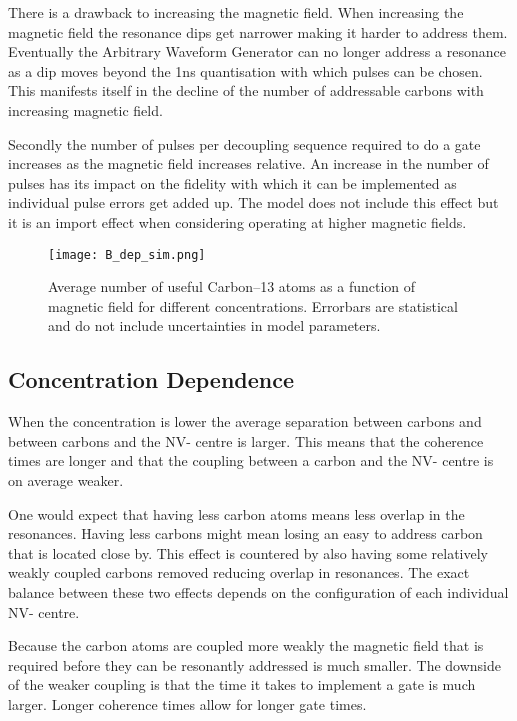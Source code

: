 There is a drawback to increasing the magnetic field. When increasing the magnetic field the resonance dips get narrower making it harder to address them. Eventually the Arbitrary Waveform Generator can no longer address a resonance as a dip moves beyond the 1ns quantisation with which pulses can be chosen. This manifests itself in the decline of the number of addressable carbons with increasing magnetic field. 

Secondly the number of pulses per decoupling sequence required to do a gate increases as the magnetic field increases relative. An increase in the number of pulses has its impact on the fidelity with which it can be implemented as individual pulse errors get added up. The model does not include this effect but it is an import effect when considering operating at higher magnetic fields.

\begin{figure}[htbp]
\centering
\texttt{[image: B\_dep\_sim.png]}
\caption{Average number of useful Carbon--13 atoms as a function of magnetic field for different concentrations. Errorbars are statistical and do not include uncertainties in model parameters.}
\label{fig:b_dep_sim}
\end{figure}



\subsection{Concentration Dependence}
\label{concentrationdependence}

When the concentration is lower the average separation between carbons and between carbons and the NV- centre is larger. This means that the coherence times are longer and that the coupling between a carbon and the NV- centre is on average weaker. 

One would expect that having less carbon atoms means less overlap in the resonances. Having less carbons might mean losing an easy to address carbon that is located close by. This effect is countered by also having some relatively weakly coupled carbons removed reducing overlap in resonances. The exact balance between these two effects depends on the configuration of each individual NV- centre. 

Because the carbon atoms are coupled more weakly the magnetic field that is required before they can be resonantly addressed is much smaller. The downside of the weaker coupling is that the time it takes to implement a gate is much larger. Longer coherence times allow for longer gate times. 

